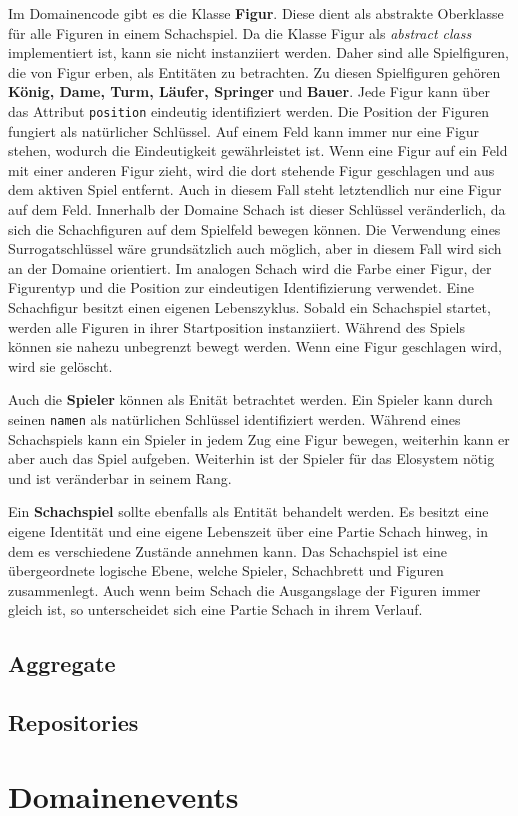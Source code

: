 Im Domainencode gibt es die Klasse \textbf{Figur}. 
Diese dient als abstrakte Oberklasse für alle Figuren in einem Schachspiel. 
Da die Klasse Figur als \textit{abstract class} implementiert ist, kann sie nicht instanziiert werden.
Daher sind alle Spielfiguren, die von Figur erben, als Entitäten zu betrachten. 
Zu diesen Spielfiguren gehören \textbf{König, Dame, Turm, Läufer, Springer} und \textbf{Bauer}. 
Jede Figur kann über das Attribut \texttt{position} eindeutig identifiziert werden. 
Die Position der Figuren fungiert als natürlicher Schlüssel. 
Auf einem Feld kann immer nur eine Figur stehen, wodurch die Eindeutigkeit gewährleistet ist. 
Wenn eine Figur auf ein Feld mit einer anderen Figur zieht, wird die dort stehende Figur geschlagen und aus dem aktiven Spiel entfernt. 
Auch in diesem Fall steht letztendlich nur eine Figur auf dem Feld. 
Innerhalb der Domaine \glqq Schach\grqq{} ist dieser Schlüssel veränderlich, da sich die Schachfiguren auf dem Spielfeld bewegen können. 
Die Verwendung eines Surrogatschlüssel wäre grundsätzlich auch möglich, aber in diesem Fall wird sich an der Domaine orientiert.
Im analogen Schach wird die Farbe einer Figur, der Figurentyp und die Position zur eindeutigen Identifizierung verwendet.   
Eine Schachfigur besitzt einen eigenen Lebenszyklus. Sobald ein Schachspiel startet, werden alle Figuren in ihrer Startposition instanziiert. Während des Spiels können sie nahezu unbegrenzt bewegt werden. Wenn eine Figur geschlagen wird, wird sie gelöscht.

Auch die \textbf{Spieler} können als Enität betrachtet werden. 
Ein Spieler kann durch seinen \texttt{namen} als natürlichen Schlüssel identifiziert werden. 
Während eines Schachspiels kann ein Spieler in jedem Zug eine Figur bewegen, weiterhin kann er aber auch das Spiel aufgeben. 
Weiterhin ist der Spieler für das Elosystem nötig und ist veränderbar in seinem Rang. 

Ein \textbf{Schachspiel} sollte ebenfalls als Entität behandelt werden. 
Es besitzt eine eigene Identität und eine eigene Lebenszeit über eine Partie Schach hinweg, in dem es verschiedene Zustände annehmen kann. 
Das Schachspiel ist eine übergeordnete logische Ebene, welche Spieler, Schachbrett und Figuren zusammenlegt. 
Auch wenn beim Schach die Ausgangslage der Figuren immer gleich ist, so unterscheidet sich eine Partie Schach in ihrem Verlauf. 

\newpage

\subsection*{Aggregate}

\subsection*{Repositories}

\section{Domainenevents}